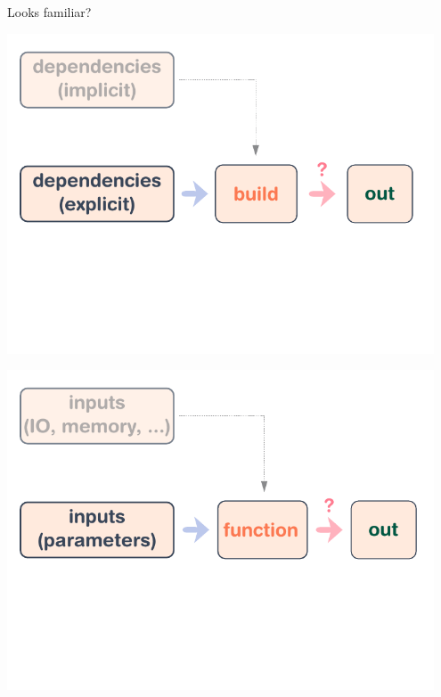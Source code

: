 \documentclass[a4paper]{beamer}
\begin{document}
\begin{frame}{Looks familiar?}
     {
        \begin{center}
            \includegraphics[width=0.95\textwidth]{img/schema-build-simplified.pdf}
        \end{center}
    }
     {
        \begin{center}
            \includegraphics[width=0.95\textwidth]{img/schema-build-functional.pdf}
        \end{center}
    }
\end{frame}
\end{document}
